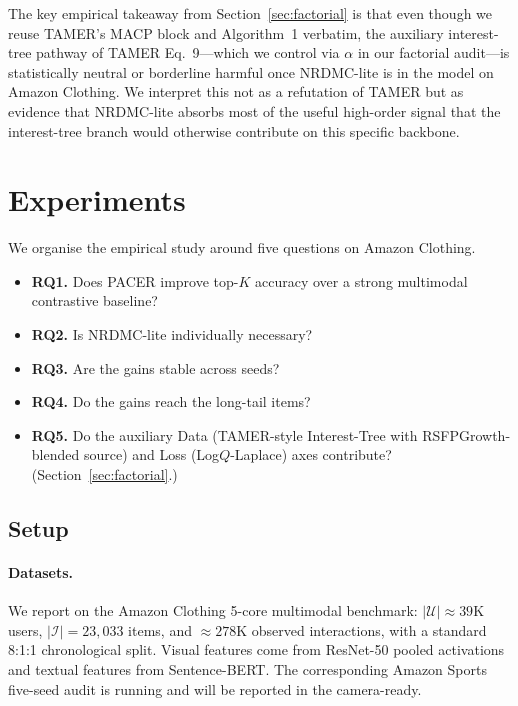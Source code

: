 \documentclass[conference]{IEEEtran}
\newcommand{\Ucal}{\mathcal{U}}
\newcommand{\Ical}{\mathcal{I}}
\begin{document}
The key empirical takeaway from Section~\ref{sec:factorial} is that
even though we reuse TAMER's MACP block and Algorithm~1 verbatim, the
auxiliary interest-tree pathway of TAMER Eq.~9---which we control
via $\alpha$ in our factorial audit---is statistically neutral or
borderline harmful once NRDMC-lite is in the model on Amazon
Clothing. We interpret this not as a refutation of TAMER but as
evidence that NRDMC-lite absorbs most of the useful high-order
signal that the interest-tree branch would otherwise contribute on
this specific backbone.

\section{Experiments}
\label{sec:results}

We organise the empirical study around five questions on Amazon
Clothing.
\begin{itemize}[leftmargin=1.2em,itemsep=1pt,topsep=1pt]
  \item \textbf{RQ1.} Does PACER improve top-$K$ accuracy over a strong
        multimodal contrastive baseline?
  \item \textbf{RQ2.} Is NRDMC-lite individually necessary?
  \item \textbf{RQ3.} Are the gains stable across seeds?
  \item \textbf{RQ4.} Do the gains reach the long-tail items?
  \item \textbf{RQ5.} Do the auxiliary Data (TAMER-style Interest-Tree with RSFPGrowth-blended source) and Loss
        (Log$Q$-Laplace) axes contribute? (Section~\ref{sec:factorial}.)
\end{itemize}

\subsection{Setup}
\label{sec:setup}

\paragraph{Datasets.} We report on the Amazon Clothing 5-core
multimodal benchmark: $|\Ucal| \approx 39\text{K}$ users,
$|\Ical| = 23{,}033$ items, and $\approx\!278\text{K}$ observed
interactions, with a standard 8:1:1 chronological split. Visual
features come from ResNet-50 pooled activations and textual features
from Sentence-BERT. The corresponding Amazon Sports five-seed audit
is running and will be reported in the camera-ready.
\end{document}
